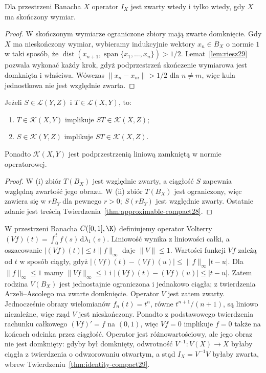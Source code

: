 \begin{twierdzenie}
\label{thm:identity-compact29}
Dla przestrzeni Banacha $X$ operator $I_X$ jest zwarty wtedy
i tylko wtedy, gdy $X$ ma skończony wymiar.
\end{twierdzenie}
\begin{proof}
W skończonym wymiarze ograniczone zbiory mają zwarte domknięcie.
Gdy $X$ ma nieskończony wymiar, wybieramy indukcyjnie wektory
$x_n\in B_X$ o normie $1$ w taki sposób, że
$\operatorname{dist}(x_{n+1},\operatorname{span}\{x_1,\ldots,x_n\})>1/2$.
Lemat~\ref{lem:riesz29} pozwala wykonać każdy krok, gdyż
podprzestrzeń skończenie wymiarowa jest domknięta i właściwa.
Wówczas $\|x_n-x_m\|>1/2$ dla $n\ne m$, więc kula jednostkowa
nie jest względnie zwarta.
\end{proof}

\begin{twierdzenie}
\label{thm:ideal-compact29}
Jeżeli $S\in\mathcal L(Y,Z)$ i $T\in\mathcal L(X,Y)$, to:
\begin{enumerate}[label=\textup{(\roman*)}]
\item $T\in\mathcal K(X,Y)$ implikuje
      $ST\in\mathcal K(X,Z)$;
\item $S\in\mathcal K(Y,Z)$ implikuje
      $ST\in\mathcal K(X,Z)$.
\end{enumerate}
Ponadto $\mathcal K(X,Y)$ jest podprzestrzenią liniową zamkniętą
w normie operatorowej.
\end{twierdzenie}
\begin{proof}
W (i) zbiór $T(B_X)$ jest względnie zwarty, a ciągłość $S$
zapewnia względną zwartość jego obrazu. W (ii) zbiór $T(B_X)$
jest ograniczony, więc zawiera się w $rB_Y$ dla pewnego $r>0$;
$S(rB_Y)$ jest względnie zwarty. Ostatnie zdanie jest treścią
Twierdzenia~\ref{thm:approximable-compact28}.
\end{proof}

\begin{przyklad}
\label{ex:volterra29}
W przestrzeni Banacha $C([0,1],\K)$ definiujemy operator Volterry
$(Vf)(t)=\int_{0}^{t}f(s)\,\mathrm d\lambda_1(s)$.
Liniowość wynika z liniowości całki, a oszacowanie
$|(Vf)(t)|\le t\|f\|_\infty$ daje $\|V\|\le1$.
Wartości funkcji $Vf$ zależą od $t$ w sposób ciągły, gdyż
$|(Vf)(t)-(Vf)(u)|\le\|f\|_\infty|t-u|$.
Dla $\|f\|_\infty\le1$ mamy $\|Vf\|_\infty\le1$ i
$|(Vf)(t)-(Vf)(u)|\le|t-u|$. Zatem rodzina $V(B_X)$
jest jednostajnie ograniczona i jednakowo ciągła;
z twierdzenia Arzeli--Ascolego ma zwarte domknięcie.
Operator $V$ jest zatem zwarty. Jednocześnie obrazy wielomianów
$f_n(t)=t^n$, równe $t^{n+1}/(n+1)$, są liniowo niezależne,
więc rząd $V$ jest nieskończony. Ponadto z podstawowego twierdzenia rachunku całkowego
$(Vf)'=f$ na $(0,1)$, więc $Vf=0$ implikuje $f=0$
także na końcach odcinka przez ciągłość. Operator jest
różnowartościowy, ale jego obraz nie jest domknięty: gdyby był domknięty, odwrotność
$V^{-1}:V(X)\to X$ byłaby ciągła z twierdzenia o odwzorowaniu
otwartym, a stąd $I_X=V^{-1}V$ byłaby zwarta, wbrew
Twierdzeniu~\ref{thm:identity-compact29}.
\end{przyklad}

